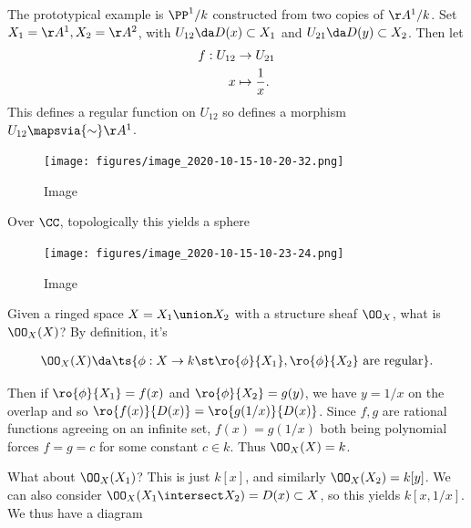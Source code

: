 \begin{example}

The prototypical example is \(\PP^1/k\) constructed from two copies of
\(\AA^1/k\). Set \(X_1 = \AA^1, X_2 = \AA^2\), with
\(U_{12} \da D(x) \subset X_1\) and \(U_{21} \da D(y) \subset X_2\).
Then let
\begin{align*}  
f: U_{12} &\to U_{21} \\
x & \mapsto {1\over x}
.\end{align*} This defines a regular function on \(U_{12}\) so defines a
morphism \(U_{12} \mapsvia{\sim} \AA^1\).

\begin{figure}
\centering
\texttt{[image: figures/image\_2020-10-15-10-20-32.png]}
\caption{Image}
\end{figure}

Over \(\CC\), topologically this yields a sphere

\begin{figure}
\centering
\texttt{[image: figures/image\_2020-10-15-10-23-24.png]}
\caption{Image}
\end{figure}

Given a ringed space \(X = X_1\union X_2\) with a structure sheaf
\(\OO_X\), what is \(\OO_X(X)\)? By definition, it's

\begin{align*}  
\OO_X(X) \da \ts{\phi: X\to k \st \ro{\phi}{X_1}, \ro{\phi}{X_2} \text{ are regular} }
.\end{align*}

Then if \(\ro{\phi}{X_1} = f(x)\) and \(\ro{\phi}{X_2} = g(y)\), we have
\(y=1/x\) on the overlap and so \(\ro{f(x)}{D(x)} = \ro{g(1/x)}{D(x)}\).
Since \(f, g\) are rational functions agreeing on an infinite set,
\(f(x) = g(1/x)\) both being polynomial forces \(f = g = c\) for some
constant \(c \in k\). Thus \(\OO_X(X) = k\).

What about \(\OO_X(X_1)\)? This is just \(k[x]\), and similarly
\(\OO_X(X_2) = k[y]\). We can also consider
\(\OO_X(X_1\intersect X_2) = D(x) \subset X\), so this yields
\(k[x, 1/x]\). We thus have a diagram

\begin{center}
\end{center}

\end{example}

